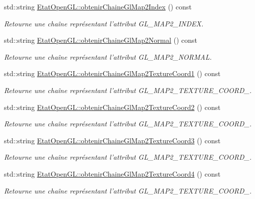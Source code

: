 \begin{DoxyCompactItemize}
std\-::string \hyperlink{group__utilitaire_ga5c26c0fce87b7c852f2819ddbc816835}{Etat\-Open\-G\-L\-::obtenir\-Chaine\-Gl\-Map2\-Index} () const 
\begin{DoxyCompactList}\small\item\em Retourne une chaîne représentant l'attribut G\-L\-\_\-\-M\-A\-P2\-\_\-\-I\-N\-D\-E\-X. \end{DoxyCompactList}\item 
std\-::string \hyperlink{group__utilitaire_ga281e64b376bb0c3f7f7090820a64bd7e}{Etat\-Open\-G\-L\-::obtenir\-Chaine\-Gl\-Map2\-Normal} () const 
\begin{DoxyCompactList}\small\item\em Retourne une chaîne représentant l'attribut G\-L\-\_\-\-M\-A\-P2\-\_\-\-N\-O\-R\-M\-A\-L. \end{DoxyCompactList}\item 
std\-::string \hyperlink{group__utilitaire_gadb7c67ea193286a4088b9dcc172abef6}{Etat\-Open\-G\-L\-::obtenir\-Chaine\-Gl\-Map2\-Texture\-Coord1} () const 
\begin{DoxyCompactList}\small\item\em Retourne une chaîne représentant l'attribut G\-L\-\_\-\-M\-A\-P2\-\_\-\-T\-E\-X\-T\-U\-R\-E\-\_\-\-C\-O\-O\-R\-D\-\_. \end{DoxyCompactList}\item 
std\-::string \hyperlink{group__utilitaire_gaf5cb23274f1ad4c504c5aed7947a3432}{Etat\-Open\-G\-L\-::obtenir\-Chaine\-Gl\-Map2\-Texture\-Coord2} () const 
\begin{DoxyCompactList}\small\item\em Retourne une chaîne représentant l'attribut G\-L\-\_\-\-M\-A\-P2\-\_\-\-T\-E\-X\-T\-U\-R\-E\-\_\-\-C\-O\-O\-R\-D\-\_. \end{DoxyCompactList}\item 
std\-::string \hyperlink{group__utilitaire_gad4b636ae980e2c420c9a7357fe8d58cc}{Etat\-Open\-G\-L\-::obtenir\-Chaine\-Gl\-Map2\-Texture\-Coord3} () const 
\begin{DoxyCompactList}\small\item\em Retourne une chaîne représentant l'attribut G\-L\-\_\-\-M\-A\-P2\-\_\-\-T\-E\-X\-T\-U\-R\-E\-\_\-\-C\-O\-O\-R\-D\-\_. \end{DoxyCompactList}\item 
std\-::string \hyperlink{group__utilitaire_ga0716a8c85e544f43620ea6664c58b570}{Etat\-Open\-G\-L\-::obtenir\-Chaine\-Gl\-Map2\-Texture\-Coord4} () const 
\begin{DoxyCompactList}\small\item\em Retourne une chaîne représentant l'attribut G\-L\-\_\-\-M\-A\-P2\-\_\-\-T\-E\-X\-T\-U\-R\-E\-\_\-\-C\-O\-O\-R\-D\-\_. \end{DoxyCompactList}\item 

\end{DoxyCompactItemize}
